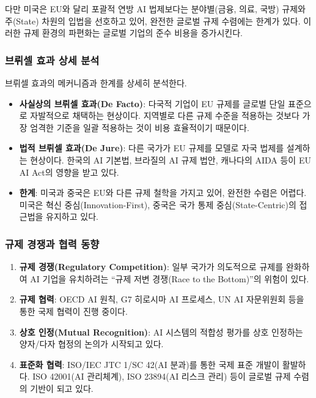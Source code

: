 다만 미국은 EU와 달리 포괄적 연방 AI 법제보다는 분야별(금융, 의료, 국방) 규제와 주(State) 차원의 입법을 선호하고 있어, 완전한 글로벌 규제 수렴에는 한계가 있다. 이러한 규제 환경의 파편화는 글로벌 기업의 준수 비용을 증가시킨다.

\subsubsection{브뤼셀 효과 상세 분석}

브뤼셀 효과의 메커니즘과 한계를 상세히 분석한다.

\begin{itemize}
 \item \textbf{사실상의 브뤼셀 효과(De Facto)}: 다국적 기업이 EU 규제를 글로벌 단일 표준으로 자발적으로 채택하는 현상이다. 지역별로 다른 규제 수준을 적용하는 것보다 가장 엄격한 기준을 일괄 적용하는 것이 비용 효율적이기 때문이다.
 \item \textbf{법적 브뤼셀 효과(De Jure)}: 다른 국가가 EU 규제를 모델로 자국 법제를 설계하는 현상이다. 한국의 AI 기본법, 브라질의 AI 규제 법안, 캐나다의 AIDA 등이 EU AI Act의 영향을 받고 있다.
 \item \textbf{한계}: 미국과 중국은 EU와 다른 규제 철학을 가지고 있어, 완전한 수렴은 어렵다. 미국은 혁신 중심(Innovation-First), 중국은 국가 통제 중심(State-Centric)의 접근법을 유지하고 있다.
\end{itemize}

\subsubsection{규제 경쟁과 협력 동향}

\begin{enumerate}
 \item \textbf{규제 경쟁(Regulatory Competition)}: 일부 국가가 의도적으로 규제를 완화하여 AI 기업을 유치하려는 ``규제 저변 경쟁(Race to the Bottom)''의 위험이 있다.
 \item \textbf{규제 협력}: OECD AI 원칙, G7 히로시마 AI 프로세스, UN AI 자문위원회 등을 통한 국제 협력이 진행 중이다.
 \item \textbf{상호 인정(Mutual Recognition)}: AI 시스템의 적합성 평가를 상호 인정하는 양자/다자 협정의 논의가 시작되고 있다.
 \item \textbf{표준화 협력}: ISO/IEC JTC 1/SC 42(AI 분과)를 통한 국제 표준 개발이 활발하다. ISO 42001(AI 관리체계), ISO 23894(AI 리스크 관리) 등이 글로벌 규제 수렴의 기반이 되고 있다.
\end{enumerate}

